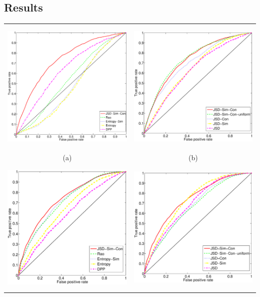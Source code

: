 \subsection{Results}
\label{sec:results}


\begin{table}[t]
\begin{center}
\begin{tabular}{CC}
\includegraphics[height=6.5cm]{figures/phonecases-comparison-new.eps}&\includegraphics[height=6.5cm]{figures/phonecases-breakdown-new.eps}\\
(a) & (b)\\
\includegraphics[height=6.5cm]{figures/nsf-comparison-new.eps}&\includegraphics[height=6.5cm]{figures/nsf-breakdown-new.eps}\\

\end{tabular}
\end{center}
\end{table}
